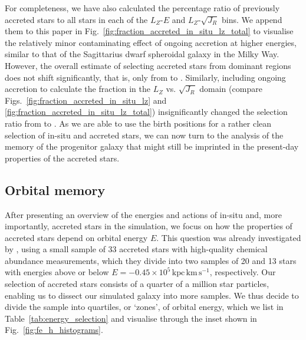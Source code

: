 \documentclass[fleqn,usenatbib]{mnras}
\newcommand{\changed}[1]{{{#1}}}
\begin{document}
For completeness, we have also calculated the percentage ratio of previously accreted stars to all stars in each of the $L_Z$-$E$ and $L_Z$-$\sqrt{J_R}$ bins. We append them to this paper in Fig.~\ref{fig:fraction_accreted_in_situ_lz_total} to visualise the relatively minor contaminating effect of ongoing accretion at higher energies, similar to that of the Sagittarius dwarf spheroidal galaxy in the Milky Way. However, the overall estimate of selecting accreted stars from dominant regions does not shift significantly, that is, only from  to . Similarly, including ongoing accretion to calculate the fraction in the $L_Z$ vs. $\sqrt{J_R}$ domain (compare Figs.~\ref{fig:fraction_accreted_in_situ_lz} and \ref{fig:fraction_accreted_in_situ_lz_total}) insignificantly changed the selection ratio from  to . As we are able to use the birth positions for a rather clean selection of in-situ and accreted stars, we can now turn to the analysis of the memory of the progenitor galaxy that might still be imprinted in the present-day properties of the accreted stars.

\subsection{\changed{Orbital memory}}
\label{sec:analysis_chemodynamic_memory}

After presenting an overview of the energies and actions of in-situ and, more importantly, accreted stars in the simulation, we focus on how the properties of accreted stars depend on orbital energy $E$. This question was already investigated by \citet{Skuladottir2025}, using a small sample of 33 accreted stars with high-quality chemical abundance measurements, which they divide into two samples of 20 and 13 stars with energies above or below $E = -0.45\times10^{5}\,\mathrm{kpc\,km\,s^{-1}}$, respectively. Our selection of accreted stars consists of a quarter of a million star particles, enabling us to dissect our simulated galaxy into more samples. We thus decide to divide the sample into quartiles, or `zones', of orbit\changed{al} energy, which we list in Table~\ref{tab:energy_selection} and visualise through the inset shown in Fig.~\ref{fig:fe_h_histograms}.
\end{document}
